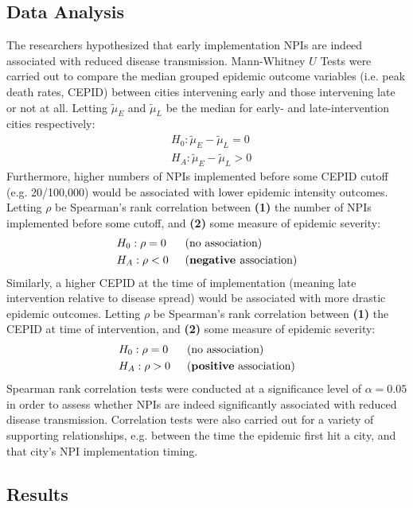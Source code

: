\documentclass{article}
\begin{document}
\begin{multicols}{2}
\columnbreak
\subsection*{Data Analysis}

The researchers hypothesized that early implementation NPIs are indeed associated with reduced disease transmission. Mann-Whitney $U$ Tests were carried out to compare the median grouped epidemic outcome variables (i.e. peak death rates, CEPID) between cities intervening early and those intervening late or not at all. Letting $\tilde\mu_E$ and $\tilde\mu_L$ be the median for early- and late-intervention cities respectively:
\begin{alignat*}{1}
    & H_0: \tilde\mu_E - \tilde\mu_L = 0 \\
    & H_A: \tilde\mu_E - \tilde\mu_L > 0
\end{alignat*}
Furthermore, higher numbers of NPIs implemented before some CEPID cutoff (e.g. 20/100,000) would be associated with lower epidemic intensity outcomes. Letting $\rho$ be Spearman's rank correlation between \textbf{(1)} the number of NPIs implemented before some cutoff, and \textbf{(2)} some measure of epidemic severity:
\begin{alignat*}{2}
    & H_0: \rho = 0 \,\,\, && \textnormal{(no association)} \\
    & H_A: \rho < 0 \,\,\, && \textnormal{(\textbf{negative }association)}
\end{alignat*}
Similarly, a higher CEPID at the time of implementation (meaning late intervention relative to disease spread) would be associated with more drastic epidemic outcomes. Letting $\rho$ be Spearman's rank correlation between \textbf{(1)} the CEPID at time of intervention, and \textbf{(2)} some measure of epidemic severity:
\begin{alignat*}{2}
    & H_0: \rho = 0 \,\,\, && \textnormal{(no association)} \\
    & H_A: \rho > 0 \,\,\, && \textnormal{(\textbf{positive} association)}
\end{alignat*}
Spearman rank correlation tests were conducted at a significance level of $\alpha = 0.05$ in order to assess whether NPIs are indeed significantly associated with reduced disease transmission. Correlation tests were also carried out for a variety of supporting relationships, e.g. between the time the epidemic first hit a city, and that city's NPI implementation timing. 

\newpage
\subsection*{Results}


\end{multicols}
\end{document}
